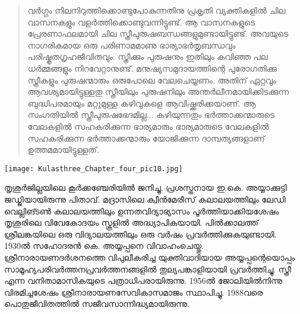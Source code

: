 \begin{quotation}
വർഗ്ഗം നിലനിറുത്തിക്കൊണ്ടുപോകുന്നതിനു പ്രകൃതി വ്യക്തികളിൽ ചില വാസനകളും വളർത്തിക്കൊണ്ടുവന്നിട്ടുണ്ട്. ആ വാസനകളുടെ പ്രേരണാഫലമായി ചില സ്ത്രീപുരുഷബന്ധങ്ങളുമുണ്ടായിട്ടുണ്ട്. അവയുടെ നാഗരികമായ ഒരു പരിണാമമാണു ഭാര്യാഭർതൃബന്ധവും പരിഷ്കൃതഗൃഹജീവിതവും. സ്ത്രീക്കും പുരുഷനും ഇതിലും കവിഞ്ഞ പല ധർമ്മങ്ങളും നിറവേറ്റാനുണ്ട്. മനുഷ്യസമുദായത്തിന്റെ പുരോഗതിക്കു സ്ത്രീകളും പുരുഷന്മാരും ഒരുപോലെ വേലചെയ്യണം. അതിന് ഏറ്റവും ആവശ്യമായിട്ടുള്ളതു സ്ത്രീയിലും പുരുഷനിലും അന്തർലീനമായിക്കിടക്കുന്ന ബുദ്ധിപരമായും മറ്റുമുള്ള കഴിവുകളെ ആവിഷ്ക്കരിക്കയാണ്. ആ സംഗതിയിൽ സ്ത്രീപുരുഷഭേദമില്ല... കഴിയുന്നതും ഭർത്താക്കന്മാരുടെ വേലകളിൽ സഹകരിക്കുന്ന ഭാര്യമാരും ഭാര്യമാരുടെ വേലകളിൽ സഹകരിക്കുന്ന ഭർത്താക്കന്മാരും യോജിക്കുന്ന ദാമ്പത്യങ്ങളാണ് ഉത്തമമായിട്ടുള്ളത്.
\end{quotation}

\label{ch4box5} %
\begin{tcolorbox}[%
 breakable, %
  arc=0mm, 
  left=1pt, right = 1pt, 
  boxrule=0mm,
  colback = {blue!10}, %
] 

\begin{center}
\texttt{[image: Kulasthree\_Chapter\_four\_pic10.jpg]}
\end{center}
തൃശൂർജില്ലയിലെ കൂർക്കഞ്ചേരിയിൽ ജനിച്ചു. പ്രശസ്തനായ ഇ.കെ. അയ്യാക്കുട്ടി ജഡ്ജിയായിരുന്നു പിതാവ്. മദ്രാസിലെ ക്വീൻമേരീസ് കലാലയത്തിലും ലേഡി വെല്ലിങ്ടൺ കലാലയത്തിലും ഉന്നതവിദ്യാഭ്യാസം പൂർത്തിയാക്കിയശേഷം തൃശൂരിലെ വിവേകോദയം സ്കൂളിൽ അദ്ധ്യാപികയായി. പിൽക്കാലത്ത് ശ്രീലങ്കയിലെ ഒരു വിദ്യാലയത്തിലും ഒരു വർഷം പ്രവർത്തിക്കുകയുണ്ടായി. 1930ൽ സഹോദരൻ കെ. അയ്യപ്പനെ വിവാഹംചെയ്തു. ശ്രീനാരായണദർശനത്തെ വിപുലീകരിച്ച യുക്തിവാദിയായ അയ്യപ്പന്റെയൊപ്പം സാമൂഹ്യപരിവർത്തനപ്രവർത്തനങ്ങളിൽ തുല്യപങ്കാളിയായി പ്രവർത്തിച്ചു. സ്ത്രീ എന്ന വനിതാമാസികയുടെ പത്രാധിപരായിരുന്നു. 1956ൽ ജോലിയിൽനിന്നു വിരമിച്ചശേഷം ശ്രീനാരായണസേവികാസമാജം സ്ഥാപിച്ചു. 1988വരെ പൊതുജീവിതത്തിൽ സജീവസാന്നിദ്ധ്യമായിരുന്നു.


\end{tcolorbox}

